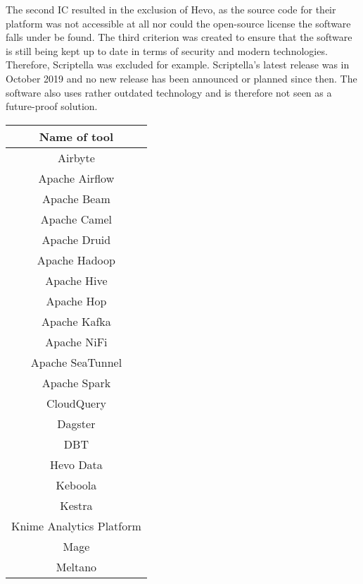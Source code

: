 \documentclass[11pt]{article}
\begin{document}
The second IC resulted in the exclusion of Hevo, as the source code for their platform was not accessible at all nor could the open-source license the software falls under be found. The third criterion was created to ensure that the software is still being kept up to date in terms of security and modern technologies. Therefore, Scriptella was excluded for example. Scriptella’s latest release was in October 2019 and no new release has been announced or planned since then. The software also uses rather outdated technology and is therefore not seen as a future-proof solution. \\

\begin{table}[H]
\centering
    \begin{tabular}{|c|}
        \hline
        \textbf{Name of tool} \\ \hline
        Airbyte \\ \hline 
        Apache Airflow \\ \hline  
        Apache Beam \\ \hline  
        Apache Camel \\ \hline
        Apache Druid \cite{Dymora202363} \\ \hline  
        Apache Hadoop \cite{Song2018233, Yoo2019476, Dymora202363} \\ \hline  
        Apache Hive \cite{Yoo2019476, HouSu20221581, Dymora202363, Camacho-Rodríguez20191773} \\ \hline 
        Apache Hop \\ \hline  
        Apache Kafka \cite{Dymora202363} \\ \hline  
        Apache NiFi \\ \hline  
        Apache SeaTunnel \\ \hline  
        Apache Spark \cite{Song2018233} \\ \hline  
        CloudQuery \\ \hline  
        Dagster \\ \hline  
        DBT \\ \hline  
        {\color[HTML]{FE0000} Hevo Data \cite{Sreemathy20211650}} \\ \hline
        {\color[HTML]{FE0000} Keboola} \\ \hline
        Kestra \\ \hline
        Knime Analytics Platform \\ \hline
        Mage \\ \hline
        Meltano \\ \hline

\end{tabular}
\end{table}
\end{document}
